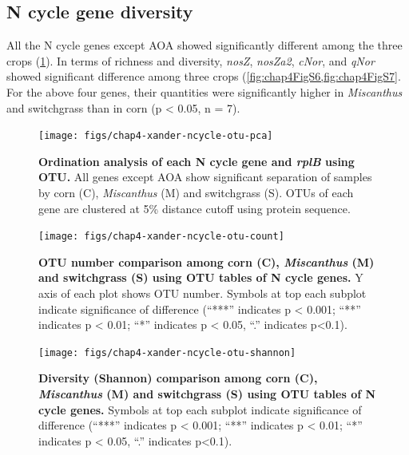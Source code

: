 \documentclass[]{msu-thesis}
\begin{document}
\subsection{N cycle gene diversity}
All the N cycle genes except AOA showed significantly different among
the three crops (\cref{fig:chap4Fig3}). In terms of richness and
diversity, \textit{nosZ}, \textit{nosZa2}, \textit{cNor}, and
\textit{qNor} showed significant difference among three crops
(\cref{fig:chap4FigS6,fig:chap4FigS7}. For the above four genes, their
quantities were significantly higher in \textit{Miscanthus} and
switchgrass than in corn (p < 0.05, n = 7).


\begin{figure}[tbph!]
  \centering
  \texttt{[image: figs/chap4-xander-ncycle-otu-pca]}
  \caption[Ordination analysis of each N cycle gene and \textit{rplB}
  using OTU]{\textbf{Ordination analysis of each N cycle gene and
    \textit{rplB} using OTU.} All genes except AOA show significant
    separation of samples by corn (C), \textit{Miscanthus} (M) and
  switchgrass (S). OTUs of each gene are clustered at 5\% distance
cutoff using protein sequence.}
  \label{fig:chap4Fig3}
\end{figure}


\begin{figure}[tbph!]
  \centering
  \texttt{[image: figs/chap4-xander-ncycle-otu-count]}
  \caption[OTU number comparison among corn (C), \textit{Miscanthus} (M)
  and switchgrass (S) using OTU tables of N cycle genes]{\textbf{OTU
    number comparison among corn (C), \textit{Miscanthus} (M) and
  switchgrass (S) using OTU tables of N cycle genes.} Y axis of each
plot shows OTU number. Symbols at top each subplot indicate significance
of difference (``***'' indicates p < 0.001; ``**'' indicates p < 0.01;
``*'' indicates p < 0.05, ``.'' indicates p<0.1).}
  \label{fig:chap4FigS6}
\end{figure}


\begin{figure}[tbph!]
  \centering
  \texttt{[image: figs/chap4-xander-ncycle-otu-shannon]}
  \caption[Diversity (Shannon) comparison among corn (C),
  \textit{Miscanthus} (M) and switchgrass (S) using OTU tables of N
cycle genes]{\textbf{Diversity (Shannon) comparison among corn (C),
  \textit{Miscanthus} (M) and switchgrass (S) using OTU tables of N
cycle genes.} Symbols at top each subplot indicate significance of
difference (``***'' indicates p < 0.001; ``**'' indicates p < 0.01;
``*'' indicates p < 0.05, ``.'' indicates p<0.1).}
  \label{fig:chap4FigS7}
\end{figure}
\end{document}
